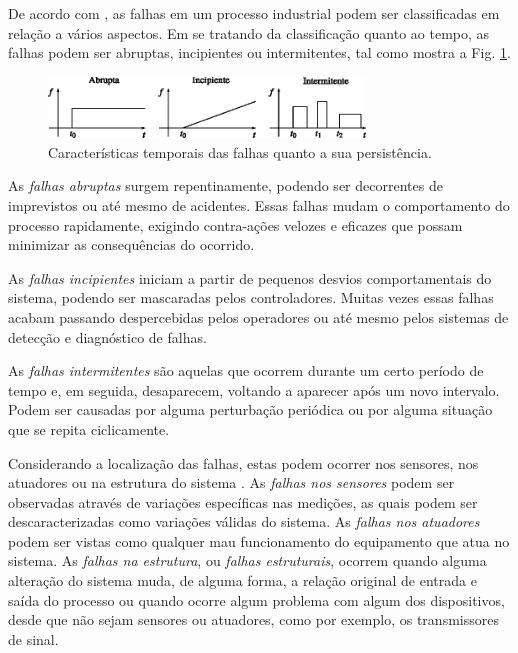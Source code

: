 De acordo com , as falhas em um processo industrial podem
ser classificadas em relação a vários aspectos. Em se tratando da classificação
quanto ao tempo, as falhas podem ser abruptas, incipientes ou intermitentes, tal
como mostra a Fig. \ref{fig:tipos_falha}.

\begin{figure}[H]
\centering
    \includegraphics[width=0.75\textwidth]{imgs/detec_diag/eps/tipos_falha}
    \caption{Características temporais das falhas quanto a sua persistência.}
    \label{fig:tipos_falha}
\end{figure}

As {\it falhas abruptas} surgem repentinamente, podendo ser decorrentes de
imprevistos ou até mesmo de acidentes. Essas falhas mudam o comportamento do
processo rapidamente, exigindo contra-ações velozes e eficazes que possam
minimizar as consequências do ocorrido.

As {\it falhas incipientes} iniciam a partir de pequenos desvios comportamentais
do sistema, podendo ser mascaradas pelos controladores.  Muitas vezes essas
falhas acabam passando despercebidas pelos operadores ou até mesmo pelos
sistemas de detecção e diagnóstico de falhas.

As {\it falhas intermitentes} são aquelas que ocorrem durante um certo período
de tempo e, em seguida, desaparecem, voltando a aparecer após um novo intervalo.
Podem ser causadas por alguma perturbação periódica ou por alguma situação que
se repita ciclicamente.

Considerando a localização das falhas, estas podem ocorrer nos sensores, nos
atuadores ou na estrutura do sistema \cite{silva:2008}. As {\it falhas nos
sensores} podem ser observadas através de variações específicas nas medições, as
quais podem ser descaracterizadas como variações válidas do sistema. As {\it
falhas nos atuadores} podem ser vistas como qualquer mau funcionamento do
equipamento que atua no sistema. As {\it falhas na estrutura}, ou {\it falhas
estruturais}, ocorrem quando alguma alteração do sistema muda, de alguma forma,
a relação original de entrada e saída do processo ou quando ocorre algum
problema com algum dos dispositivos, desde que não sejam sensores ou atuadores,
como por exemplo, os transmissores de sinal.

